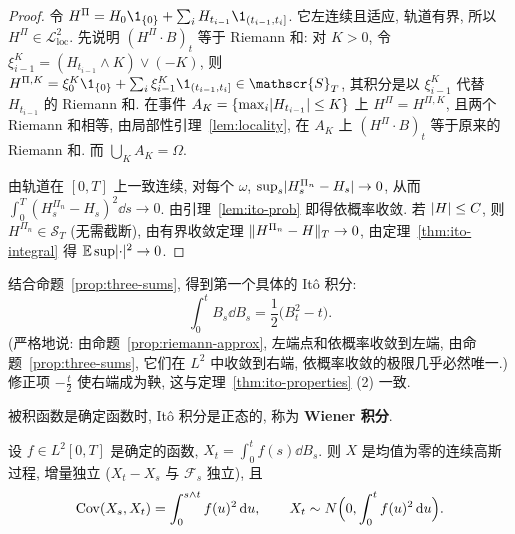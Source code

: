 \begin{proof}
令 $H^{\Pi}=H_0\1_{\{0\}}+\sum_iH_{t_{i-1}}\1_{(t_{i-1},t_i]}$. 它左连续且适应, 轨道有界, 所以 $H^\Pi\in\mathscr{L}^2_{\mathrm{loc}}$. 先说明 $(H^\Pi\cdot B)_t$ 等于 Riemann 和: 对 $K>0$, 令 $\xi^K_{i-1}=(H_{t_{i-1}}\wedge K)\vee(-K)$, 则 $H^{\Pi,K}=\xi_0^K\1_{\{0\}}+\sum_i\xi^K_{i-1}\1_{(t_{i-1},t_i]}\in\mathscr{S}_T$, 其积分是以 $\xi^K_{i-1}$ 代替 $H_{t_{i-1}}$ 的 Riemann 和. 在事件 $A_K=\{\max_i\lvert H_{t_{i-1}}\rvert\le K\}$ 上 $H^\Pi=H^{\Pi,K}$, 且两个 Riemann 和相等, 由局部性引理~\ref{lem:locality}, 在 $A_K$ 上 $(H^\Pi\cdot B)_t$ 等于原来的 Riemann 和. 而 $\bigcup_KA_K=\Omega$.

由轨道在 $[0,T]$ 上一致连续, 对每个 $\omega$, $\sup_s\lvert H^{\Pi_n}_s-H_s\rvert\to0$, 从而 $\int_0^T(H^{\Pi_n}_s-H_s)^2\dd s\to0$. 由引理~\ref{lem:ito-prob} 即得依概率收敛. 若 $\lvert H\rvert\le C$, 则 $H^{\Pi_n}\in\mathscr{S}_T$ (无需截断), 由有界收敛定理 $\lVert H^{\Pi_n}-H\rVert_T\to0$, 由定理~\ref{thm:ito-integral} 得 $\mathbb{E}\sup\lvert\cdot\rvert^2\to0$.
\end{proof}

结合命题~\ref{prop:three-sums}, 得到第一个具体的 It\^o 积分:
\begin{equation}\label{eq:int-BdB}
\int_0^tB_s\dd B_s=\frac{1}{2}\big(B_t^2-t\big).
\end{equation}
(严格地说: 由命题~\ref{prop:riemann-approx}, 左端点和依概率收敛到左端, 由命题~\ref{prop:three-sums}, 它们在 $L^2$ 中收敛到右端, 依概率收敛的极限几乎必然唯一.) 修正项 $-\frac{t}{2}$ 使右端成为鞅, 这与定理~\ref{thm:ito-properties} (2) 一致.

被积函数是确定函数时, It\^o 积分是正态的, 称为 \textbf{Wiener 积分}.

\begin{proposition}[Wiener 积分]\label{prop:wiener-integral}
设 $f\in L^2[0,T]$ 是确定的函数, $X_t=\int_0^tf(s)\dd B_s$. 则 $X$ 是均值为零的连续高斯过程, 增量独立 ($X_t-X_s$ 与 $\mathcal{F}_s$ 独立), 且
\[
\operatorname{Cov}(X_s,X_t)=\int_0^{s\wedge t}f(u)^2\mathop{}\!\mathrm{d} u,\qquad X_t\sim N\Big(0,\int_0^tf(u)^2\mathop{}\!\mathrm{d} u\Big).
\]
\end{proposition}

